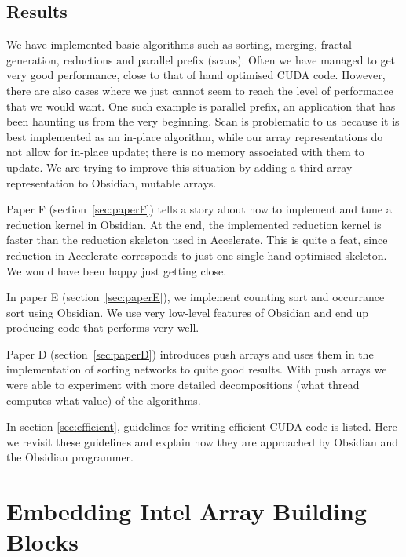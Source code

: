 \documentclass[a4paper]{book}
\begin{document}
\subsection{Results}
\FloatBarrier 

We have implemented basic algorithms such as sorting, merging, fractal generation, reductions 
and parallel prefix (scans). Often we have managed to get very good performance, close to that 
of hand optimised CUDA code. However, there are also cases where we just cannot seem to reach 
the level of performance that we would want. One such example is parallel prefix, an 
application that has been haunting us from the very beginning. Scan is problematic to us because 
it is best implemented as an in-place algorithm, while our array representations do 
not allow for in-place update; there is no memory associated with them to update. 
We are trying to improve this situation by adding a third array representation to Obsidian,
mutable arrays.   

Paper F (section~\ref{sec:paperF}) tells a story about how to implement and tune 
a reduction kernel in Obsidian. At the end, the implemented reduction kernel is  
faster than the reduction skeleton used in Accelerate. This is quite a feat, since 
reduction in Accelerate corresponds to just one single hand optimised skeleton. We would have 
been happy just getting close.   

In paper E (section~\ref{sec:paperE}), we implement counting sort and occurrance sort 
using Obsidian. We use very low-level features of Obsidian and end up producing 
code that performs very well. 

Paper D (section~\ref{sec:paperD}) introduces push arrays and uses them in the 
implementation of sorting networks to quite good results. With push arrays we 
were able to experiment with more detailed decompositions (what thread computes 
what value) of the algorithms. 

In section \ref{sec:efficient}, guidelines for writing efficient CUDA code is listed. 
Here we revisit these guidelines and explain how they are approached by Obsidian and 
the Obsidian programmer. 

\FloatBarrier 
%
%
\section{Embedding Intel Array Building Blocks} 
\end{document}
